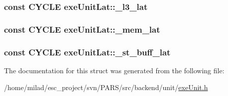 \label{structexeUnitLat_a0a5e96d306ef23a2d69c8e97d62b27fd}
\hypertarget{structexeUnitLat_ae34f390b9e9b8e9d792a6656b801eca4}{
\subsubsection[{\_\-l3\_\-lat}]{\setlength{\rightskip}{0pt plus 5cm}const {\bf CYCLE} {\bf exeUnitLat::\_\-l3\_\-lat}}}
\label{structexeUnitLat_ae34f390b9e9b8e9d792a6656b801eca4}
\hypertarget{structexeUnitLat_a0478d29cba99e1c3849dceb6ecfca973}{
\subsubsection[{\_\-mem\_\-lat}]{\setlength{\rightskip}{0pt plus 5cm}const {\bf CYCLE} {\bf exeUnitLat::\_\-mem\_\-lat}}}
\label{structexeUnitLat_a0478d29cba99e1c3849dceb6ecfca973}
\hypertarget{structexeUnitLat_a2e0a0b29c7d4cd40492fe25740302c72}{
\subsubsection[{\_\-st\_\-buff\_\-lat}]{\setlength{\rightskip}{0pt plus 5cm}const {\bf CYCLE} {\bf exeUnitLat::\_\-st\_\-buff\_\-lat}}}
\label{structexeUnitLat_a2e0a0b29c7d4cd40492fe25740302c72}


The documentation for this struct was generated from the following file:\begin{DoxyCompactItemize}
\item 
/home/milad/esc\_\-project/svn/PARS/src/backend/unit/\hyperlink{exeUnit_8h}{exeUnit.h}\end{DoxyCompactItemize}
